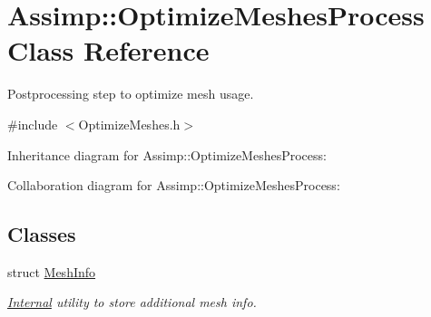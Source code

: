 \hypertarget{class_assimp_1_1_optimize_meshes_process}{\section{Assimp\+:\+:Optimize\+Meshes\+Process Class Reference}
\label{class_assimp_1_1_optimize_meshes_process}
}


Postprocessing step to optimize mesh usage.  




{\ttfamily \#include $<$Optimize\+Meshes.\+h$>$}



Inheritance diagram for Assimp\+:\+:Optimize\+Meshes\+Process\+:


Collaboration diagram for Assimp\+:\+:Optimize\+Meshes\+Process\+:
\subsection*{Classes}
\begin{DoxyCompactItemize}
\item 
struct \hyperlink{struct_assimp_1_1_optimize_meshes_process_1_1_mesh_info}{Mesh\+Info}
\begin{DoxyCompactList}\small\item\em \hyperlink{struct_internal}{Internal} utility to store additional mesh info. \end{DoxyCompactList}\end{DoxyCompactItemize}
